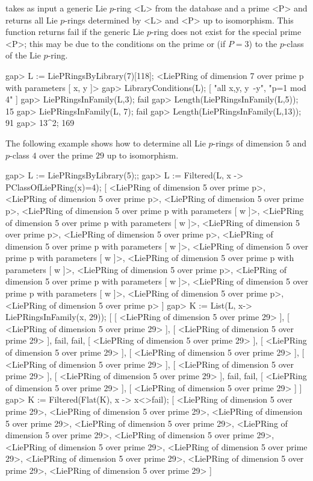 takes as input a generic Lie $p$-ring <L> from the database and a prime <P> 
and returns all Lie $p$-rings determined by <L> and <P> up to isomorphism. 
This function returns fail if the generic Lie $p$-ring does not exist for 
the special prime <P>; this may be due to the conditions on the prime or
(if $P=3$) to the $p$-class of the Lie $p$-ring. 

\beginexample
gap> L := LiePRingsByLibrary(7)[118];
<LiePRing of dimension 7 over prime p with parameters [ x, y ]>
gap> LibraryConditions(L);
[ "all x,y, y~-y", "p=1 mod 4" ]
gap> LiePRingsInFamily(L,3);
fail
gap> Length(LiePRingsInFamily(L,5));
15
gap> LiePRingsInFamily(L, 7);
fail
gap> Length(LiePRingsInFamily(L,13));
91
gap> 13^2;
169
\endexample

The following example shows how to determine all Lie $p$-rings of dimension
$5$ and $p$-class $4$ over the prime $29$ up to isomorphism.

\beginexample
gap> L := LiePRingsByLibrary(5);;
gap> L := Filtered(L, x -> PClassOfLiePRing(x)=4);
[ <LiePRing of dimension 5 over prime p>, 
  <LiePRing of dimension 5 over prime p>, 
  <LiePRing of dimension 5 over prime p>, 
  <LiePRing of dimension 5 over prime p with parameters [ w ]>, 
  <LiePRing of dimension 5 over prime p with parameters [ w ]>, 
  <LiePRing of dimension 5 over prime p>, 
  <LiePRing of dimension 5 over prime p>, 
  <LiePRing of dimension 5 over prime p with parameters [ w ]>, 
  <LiePRing of dimension 5 over prime p with parameters [ w ]>, 
  <LiePRing of dimension 5 over prime p with parameters [ w ]>, 
  <LiePRing of dimension 5 over prime p>, 
  <LiePRing of dimension 5 over prime p with parameters [ w ]>, 
  <LiePRing of dimension 5 over prime p with parameters [ w ]>, 
  <LiePRing of dimension 5 over prime p>, 
  <LiePRing of dimension 5 over prime p> ]
gap> K := List(L, x-> LiePRingsInFamily(x, 29));
[ [ <LiePRing of dimension 5 over prime 29> ], 
  [ <LiePRing of dimension 5 over prime 29> ], 
  [ <LiePRing of dimension 5 over prime 29> ], fail, fail, 
  [ <LiePRing of dimension 5 over prime 29> ], 
  [ <LiePRing of dimension 5 over prime 29> ], 
  [ <LiePRing of dimension 5 over prime 29> ], 
  [ <LiePRing of dimension 5 over prime 29> ], 
  [ <LiePRing of dimension 5 over prime 29> ], 
  [ <LiePRing of dimension 5 over prime 29> ], fail, fail, 
  [ <LiePRing of dimension 5 over prime 29> ], 
  [ <LiePRing of dimension 5 over prime 29> ] ]
gap> K := Filtered(Flat(K), x -> x<>fail);
[ <LiePRing of dimension 5 over prime 29>, 
  <LiePRing of dimension 5 over prime 29>, 
  <LiePRing of dimension 5 over prime 29>, 
  <LiePRing of dimension 5 over prime 29>, 
  <LiePRing of dimension 5 over prime 29>, 
  <LiePRing of dimension 5 over prime 29>, 
  <LiePRing of dimension 5 over prime 29>, 
  <LiePRing of dimension 5 over prime 29>, 
  <LiePRing of dimension 5 over prime 29>, 
  <LiePRing of dimension 5 over prime 29>, 
  <LiePRing of dimension 5 over prime 29> ]
\endexample

